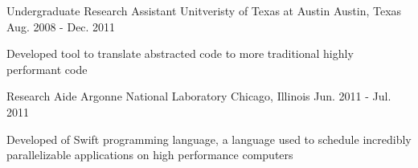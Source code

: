 \begin{cventries}
\cventry
{Undergraduate Research Assistant} %
{Unitveristy of Texas at Austin} %
{Austin, Texas} %
{Aug. 2008 - Dec. 2011} %
{ %
\begin{cvitems}
\item {Developed tool to translate abstracted code to more traditional highly performant code}
\end{cvitems} 
}


\cventry
{Research Aide} %
{Argonne National Laboratory} %
{Chicago, Illinois} %
{Jun. 2011 - Jul. 2011} %
{ %
\begin{cvitems}
\item {Developed of Swift programming language, a language used to schedule incredibly parallelizable applications on high performance computers}
\end{cvitems}
}


\end{cventries}